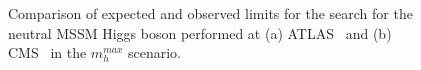 \begin{figure}[!hp]
     \begin{center}
	
    \end{center}
    \caption{Comparison of expected and observed limits for the search for the neutral MSSM Higgs boson performed at (a) ATLAS~\cite{yuppy} 
	and (b) CMS~\cite{CMSLimit} in the $m_h^{max}$ scenario.} 
   \label{fig:limitcomparisons}
\end{figure}






